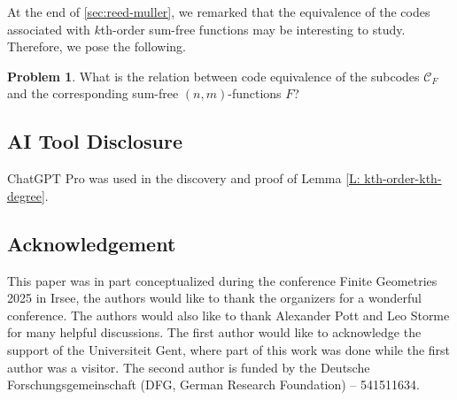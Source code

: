 \documentclass[12pt]{article}
\theoremstyle{definition}
\newtheorem{problem}[thm]{Problem}
\begin{document}
At the end of \cref{sec:reed-muller}, we remarked that the equivalence of the codes associated with $k$th-order sum-free functions may be interesting to study. Therefore, we pose the following.
\begin{problem}
    What is the relation between code equivalence of the subcodes $\mathcal{C}_F$ and the corresponding sum-free $(n,m)$-functions $F$?
\end{problem}







\subsection*{AI Tool Disclosure}

ChatGPT Pro was used in the discovery and proof of Lemma \ref{L: kth-order-kth-degree}. 

\subsection*{Acknowledgement}

This paper was in part conceptualized during the conference Finite Geometries 2025 in Irsee, the authors would like to thank the organizers for a wonderful conference. 
The authors would also like to thank Alexander Pott and Leo Storme for many helpful discussions.
The first author would like to acknowledge the support of the Universiteit Gent, where part of this work was done while the first author was a visitor. 
The second author is funded by the Deutsche Forschungsgemeinschaft (DFG, German Research Foundation) – 541511634.





\end{document}
